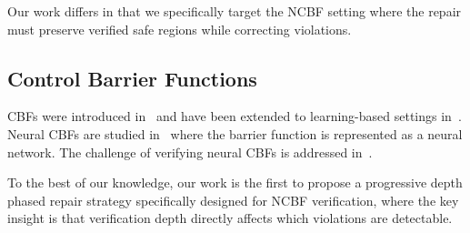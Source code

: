 Our work differs in that we specifically target the NCBF setting where the repair must preserve verified safe regions while correcting violations.

\subsection{Control Barrier Functions}

CBFs were introduced in~\citep{ames2019control} and have been extended to learning-based settings in~\citep{jwang2020learning}. Neural CBFs are studied in~\citep{cheng2019end, agarwal2019learning} where the barrier function is represented as a neural network. The challenge of verifying neural CBFs is addressed in~\citep{srinivasan2020verification, chang2019verified}.

To the best of our knowledge, our work is the first to propose a progressive depth phased repair strategy specifically designed for NCBF verification, where the key insight is that verification depth directly affects which violations are detectable.